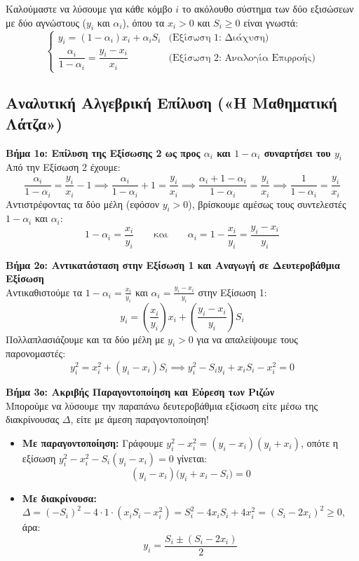 \documentclass[11pt, a4paper]{article}
\begin{document}
Καλούμαστε να λύσουμε για κάθε κόμβο $i$ το ακόλουθο σύστημα των δύο εξισώσεων με δύο αγνώστους ($y_i$ και $\alpha_i$), όπου τα $x_i > 0$ και $S_i \ge 0$ είναι γνωστά:
\[
\begin{cases}
y_i = (1 - \alpha_i) x_i + \alpha_i S_i & \text{(Εξίσωση 1: Διάχυση)} \\[8pt]
\dfrac{\alpha_i}{1 - \alpha_i} = \dfrac{y_i - x_i}{x_i} & \text{(Εξίσωση 2: Αναλογία Επιρροής)}
\end{cases}
\]

\subsection{Αναλυτική Αλγεβρική Επίλυση («Η Μαθηματική Λάτζα»)}

\noindent\textbf{Βήμα 1ο: Επίλυση της Εξίσωσης 2 ως προς $\alpha_i$ και $1 - \alpha_i$ συναρτήσει του $y_i$} \\
Από την Εξίσωση 2 έχουμε:
\[
\frac{\alpha_i}{1 - \alpha_i} = \frac{y_i}{x_i} - 1 \implies \frac{\alpha_i}{1 - \alpha_i} + 1 = \frac{y_i}{x_i} \implies \frac{\alpha_i + 1 - \alpha_i}{1 - \alpha_i} = \frac{y_i}{x_i} \implies \frac{1}{1 - \alpha_i} = \frac{y_i}{x_i}
\]
Αντιστρέφοντας τα δύο μέλη (εφόσον $y_i > 0$), βρίσκουμε αμέσως τους συντελεστές $1 - \alpha_i$ και $\alpha_i$:
\[
1 - \alpha_i = \frac{x_i}{y_i} \qquad \text{και} \qquad \alpha_i = 1 - \frac{x_i}{y_i} = \frac{y_i - x_i}{y_i}
\]

\vspace{0.2cm}
\noindent\textbf{Βήμα 2ο: Αντικατάσταση στην Εξίσωση 1 και Αναγωγή σε Δευτεροβάθμια Εξίσωση} \\
Αντικαθιστούμε τα $1 - \alpha_i = \frac{x_i}{y_i}$ και $\alpha_i = \frac{y_i - x_i}{y_i}$ στην Εξίσωση 1:
\[
y_i = \left(\frac{x_i}{y_i}\right) x_i + \left(\frac{y_i - x_i}{y_i}\right) S_i
\]
Πολλαπλασιάζουμε και τα δύο μέλη με $y_i > 0$ για να απαλείψουμε τους παρονομαστές:
\[
y_i^2 = x_i^2 + (y_i - x_i) S_i \implies y_i^2 - S_i y_i + x_i S_i - x_i^2 = 0
\]

\vspace{0.2cm}
\noindent\textbf{Βήμα 3ο: Ακριβής Παραγοντοποίηση και Εύρεση των Ριζών} \\
Μπορούμε να λύσουμε την παραπάνω δευτεροβάθμια εξίσωση είτε μέσω της διακρίνουσας $\Delta$, είτε με άμεση παραγοντοποίηση!
\begin{itemize}
    \item \textbf{Με παραγοντοποίηση:} Γράφουμε $y_i^2 - x_i^2 = (y_i - x_i)(y_i + x_i)$, οπότε η εξίσωση $y_i^2 - x_i^2 - S_i(y_i - x_i) = 0$ γίνεται:
    \[
    (y_i - x_i)\big(y_i + x_i - S_i\big) = 0
    \]
    \item \textbf{Με διακρίνουσα:} $\Delta = (-S_i)^2 - 4 \cdot 1 \cdot (x_i S_i - x_i^2) = S_i^2 - 4x_i S_i + 4x_i^2 = (S_i - 2x_i)^2 \ge 0$, άρα:
    \[
    y_i = \frac{S_i \pm (S_i - 2x_i)}{2}
    \]
\end{itemize}
\end{document}
